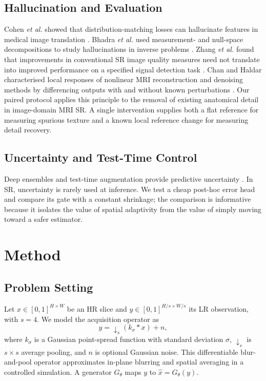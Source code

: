 \documentclass[journal]{IEEEtran}
\begin{document}
\subsection{Hallucination and Evaluation}
Cohen \emph{et al.} showed that distribution-matching losses can hallucinate features in medical image translation \cite{cohen2018hallucinate}. Bhadra \emph{et al.} used measurement- and null-space decompositions to study hallucinations in inverse problems \cite{bhadra2021hallucinations}. Zhang \emph{et al.} found that improvements in conventional SR image quality measures need not translate into improved performance on a specified signal detection task \cite{zhang2021signal}. Chan and Haldar characterised local responses of nonlinear MRI reconstruction and denoising methods by differencing outputs with and without known perturbations \cite{chan2021lpr}. Our paired protocol applies this principle to the removal of existing anatomical detail in image-domain MRI SR. A single intervention supplies both a flat reference for measuring spurious texture and a known local reference change for measuring detail recovery.

\subsection{Uncertainty and Test-Time Control}
Deep ensembles and test-time augmentation provide predictive uncertainty \cite{lakshminarayanan2017ensembles,wang2019tta}. In SR, uncertainty is rarely used at inference. We test a cheap post-hoc error head and compare its gate with a constant shrinkage; the comparison is informative because it isolates the value of spatial adaptivity from the value of simply moving toward a safer estimator.

\section{Method}
\subsection{Problem Setting}
Let $x\in[0,1]^{H\times W}$ be an HR slice and $y\in[0,1]^{H/s\times W/s}$ its LR observation, with $s=4$. We model the acquisition operator as
\begin{equation}
y = \downarrow_s\!\left(k_\sigma * x\right) + n,
\label{eq:degradation}
\end{equation}
where $k_\sigma$ is a Gaussian point-spread function with standard deviation $\sigma$, $\downarrow_s$ is $s\times s$ average pooling, and $n$ is optional Gaussian noise. This differentiable blur-and-pool operator approximates in-plane blurring and spatial averaging in a controlled simulation. A generator $G_\theta$ maps $y$ to $\hat{x}=G_\theta(y)$.
\end{document}
